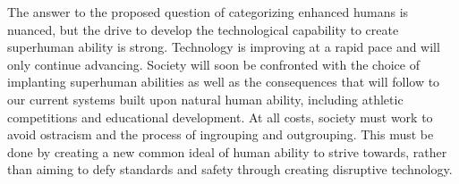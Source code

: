\documentclass[10pt, oneside, letterpaper]{article}
\begin{document}
\begin{multicols}{2}
	The answer to the proposed question of categorizing enhanced humans is nuanced, but the drive to develop the technological capability to create superhuman ability is strong. Technology is improving at a rapid pace and will only continue advancing. Society will soon be confronted with the choice of implanting superhuman abilities as well as the consequences that will follow to our current systems built upon natural human ability, including athletic competitions and educational development. At all costs, society must work to avoid ostracism and the process of ingrouping and outgrouping. This must be done by creating a new common ideal of human ability to strive towards, rather than aiming to defy standards and safety through creating disruptive technology.

	\end{multicols}

	{\RaggedRight
		
		
	}
\end{document}
